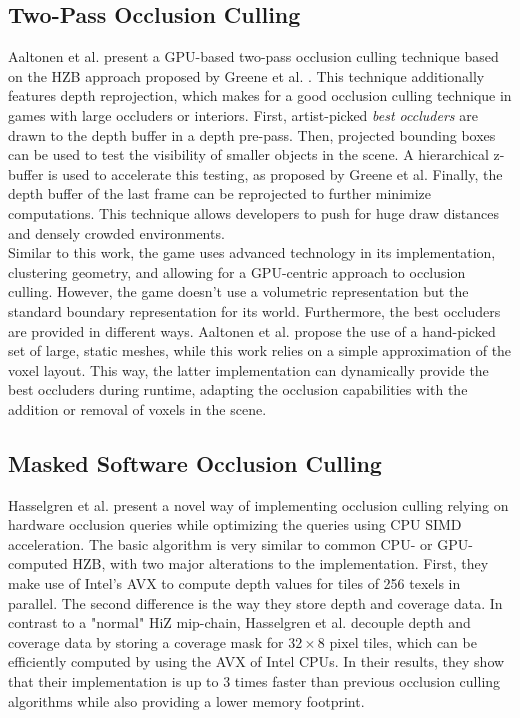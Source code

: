 \subsection*{Two-Pass Occlusion Culling}

Aaltonen et al. \cite{Aaltonen2015} present a \ac{GPU}-based two-pass occlusion culling technique based on 
the \ac{HZB} approach proposed by Greene et al. \cite{Greene93,Greene95}. This technique additionally features 
depth reprojection, which makes for a good occlusion culling technique in games with large occluders or interiors. 
First, artist-picked \emph{best occluders} are drawn to the depth buffer in a depth pre-pass. Then, projected 
bounding boxes can be used to test the visibility of smaller objects in the scene. A hierarchical z-buffer is 
used to accelerate this testing, as proposed by Greene et al. Finally, the depth buffer of the last frame can 
be reprojected to further minimize computations. This technique allows developers to push for huge draw distances 
and densely crowded environments. \\

\noindent
Similar to this work, the game uses advanced technology in its implementation, clustering geometry, and allowing 
for a \ac{GPU}-centric approach to occlusion culling. However, the game doesn't use a volumetric representation 
but the standard boundary representation for its world. Furthermore, the best occluders are provided in different 
ways. Aaltonen et al. \cite{Aaltonen2015} propose the use of a hand-picked set of large, static meshes, while this 
work relies on a simple approximation of the voxel layout. This way, the latter implementation can dynamically 
provide the best occluders during runtime, adapting the occlusion capabilities with the addition or removal of 
voxels in the scene.


\subsection*{Masked Software Occlusion Culling}

Hasselgren et al. \cite{Hasselgren2016} present a novel way of implementing occlusion culling relying on hardware 
occlusion queries while optimizing the queries using \ac{CPU} \ac{SIMD} acceleration. The basic algorithm is very 
similar to common \ac{CPU}- or \ac{GPU}-computed \ac{HZB}, with two major alterations to the implementation. First, 
they make use of Intel's \ac{AVX} to compute depth values for tiles of 256 texels in parallel. The second difference 
is the way they store depth and coverage data. In contrast to a "normal" \ac{HiZ} mip-chain, Hasselgren et al. 
decouple depth and coverage data by storing a coverage mask for \begin{math}32 \times 8\end{math} pixel tiles, 
which can be efficiently computed by using the \ac{AVX} of Intel \ac{CPU}s. In their results, they show that their 
implementation is up to 3 times faster than previous occlusion culling algorithms while also providing a lower 
memory footprint. \\

